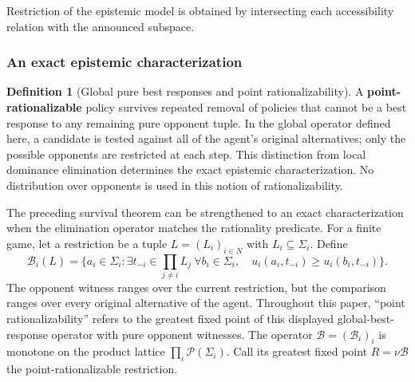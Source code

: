 \documentclass[11pt,a4paper]{article}
\numberwithin{equation}{section}
\theoremstyle{definition}
\newtheorem{definition}[theorem]{Definition}
\theoremstyle{remark}
\theoremstyle{plain}
\begin{document}
\noindent Restriction of the epistemic model is obtained by intersecting each accessibility relation with the announced subspace.
\begin{center}
\end{center}

\subsubsection{An exact epistemic characterization}

\begin{definition}[Global pure best responses and point rationalizability]
\label{def:egt-global-pure-best-responses-and-point-rationalizability}
A \textbf{point-rationalizable} policy survives repeated removal of
policies that cannot be a best response to any remaining pure opponent
tuple. In the global operator defined here, a candidate is tested against all of
the agent's original alternatives; only the possible opponents are
restricted at each step. This distinction from local dominance elimination
determines the exact epistemic characterization. No distribution over
opponents is used in this notion of rationalizability.

The preceding survival theorem can be strengthened to an exact
characterization when the elimination operator matches the rationality
predicate. For a finite game, let a restriction be a tuple
$L=(L_i)_{i\in N}$ with $L_i\subseteq\Sigma_i$. Define
\[
 \mathcal B_i(L)=\{a_i\in\Sigma_i:
   \exists t_{-i}\in\prod_{j\ne i}L_j\
   \forall b_i\in\Sigma_i,\quad
        u_i(a_i,t_{-i})\geq u_i(b_i,t_{-i})\}.
\]
The opponent witness ranges over the current restriction, but the
comparison ranges over every original alternative of the agent. Throughout
this paper, ``point rationalizability'' refers to the greatest fixed point
of this displayed global-best-response operator with pure opponent witnesses.
The operator $\mathcal B=(\mathcal B_i)_i$ is monotone on the
product lattice $\prod_i\mathcal P(\Sigma_i)$. Call its greatest
fixed point $R=\nu\mathcal B$ the point-rationalizable restriction.
\end{definition}
\end{document}
